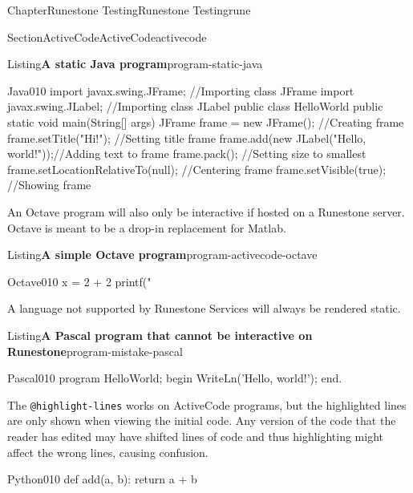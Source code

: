 \documentclass[oneside,10pt,]{book}
\newcommand{\mono}[1]{\texttt{#1}}
\numberwithin{equation}{section}
\begin{document}
\begin{chapterptx}{Chapter}{Runestone Testing}{}{Runestone Testing}{}{}{rune}
\begin{sectionptx}{Section}{ActiveCode}{}{ActiveCode}{}{}{activecode}
\begin{listingptx}{Listing}{\textbf{A static Java program}}{program-static-java}{}
\begin{program}{Java}{0}{1}{0}
import javax.swing.JFrame;  //Importing class JFrame
import javax.swing.JLabel;  //Importing class JLabel
public class HelloWorld {
    public static void main(String[] args) {
        JFrame frame = new JFrame();           //Creating frame
        frame.setTitle("Hi!");                 //Setting title frame
        frame.add(new JLabel("Hello, world!"));//Adding text to frame
        frame.pack();                          //Setting size to smallest
        frame.setLocationRelativeTo(null);     //Centering frame
        frame.setVisible(true);                //Showing frame
    }
}
\end{program}
\end{listingptx}%
An Octave program will also only be interactive if hosted on a Runestone server.  Octave is meant to be a drop-in replacement for Matlab.%
\begin{listingptx}{Listing}{\textbf{A simple Octave program}}{program-activecode-octave}{}%
\begin{program}{Octave}{0}{1}{0}
x = 2 + 2
printf("%
\end{program}
\end{listingptx}%
A language not supported by Runestone Services will always be rendered static.%
\begin{listingptx}{Listing}{\textbf{A Pascal program that cannot be interactive on Runestone}}{program-mistake-pascal}{}%
\begin{program}{Pascal}{0}{1}{0}
program HelloWorld;
begin
  WriteLn('Hello, world!');
end.
\end{program}
\end{listingptx}%
The \mono{@highlight-lines} works on ActiveCode programs, but the highlighted lines are only shown when viewing the initial code. Any version of the code that the reader has edited may have shifted lines of code and thus highlighting might affect the wrong lines, causing confusion.%
\begin{program}{Python}{0}{1}{0}
def add(a, b):
    return a + b


\end{program}
\end{sectionptx}
\end{chapterptx}
\end{document}

